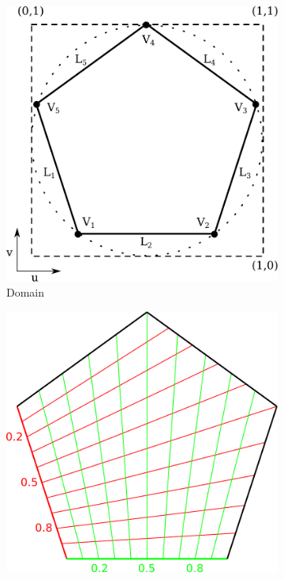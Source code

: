 \documentclass{article}
\begin{document}
\begin{figure}[b!]
  \begin{subfigure}{0.30\textwidth}
    \includegraphics[width = \textwidth]{images/domain.pdf}
    \caption{Domain}
    \label{fig:domain}
  \end{subfigure}
  \hfill
  \begin{subfigure}{0.3\textwidth}
    \begin{minipage}[b][5cm][b]{\textwidth}
      \centering
      \includegraphics[width = \textwidth]{images/s-params.pdf}

\end{minipage}
\end{subfigure}
\end{figure}
\end{document}
